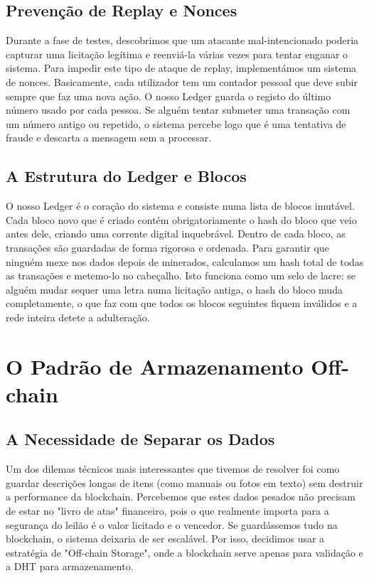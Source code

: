 \documentclass[11pt]{article}
\begin{document}
\subsection{Prevenção de Replay e Nonces}
Durante a fase de testes, descobrimos que um atacante mal-intencionado poderia capturar uma licitação legítima e reenviá-la várias vezes para tentar enganar o sistema. Para impedir este tipo de ataque de replay, implementámos um sistema de nonces. Basicamente, cada utilizador tem um contador pessoal que deve subir sempre que faz uma nova ação. O nosso Ledger guarda o registo do último número usado por cada pessoa. Se alguém tentar submeter uma transação com um número antigo ou repetido, o sistema percebe logo que é uma tentativa de fraude e descarta a mensagem sem a processar.

\subsection{A Estrutura do Ledger e Blocos}
O nosso Ledger é o coração do sistema e consiste numa lista de blocos imutável. Cada bloco novo que é criado contém obrigatoriamente o hash do bloco que veio antes dele, criando uma corrente digital inquebrável. Dentro de cada bloco, as transações são guardadas de forma rigorosa e ordenada. Para garantir que ninguém mexe nos dados depois de minerados, calculamos um hash total de todas as transações e metemo-lo no cabeçalho. Isto funciona como um selo de lacre: se alguém mudar sequer uma letra numa licitação antiga, o hash do bloco muda completamente, o que faz com que todos os blocos seguintes fiquem inválidos e a rede inteira detete a adulteração.

\section{O Padrão de Armazenamento Off-chain}

\subsection{A Necessidade de Separar os Dados}
Um dos dilemas técnicos mais interessantes que tivemos de resolver foi como guardar descrições longas de itens (como manuais ou fotos em texto) sem destruir a performance da blockchain. Percebemos que estes dados pesados não precisam de estar no "livro de atas" financeiro, pois o que realmente importa para a segurança do leilão é o valor licitado e o vencedor. Se guardássemos tudo na blockchain, o sistema deixaria de ser escalável. Por isso, decidimos usar a estratégia de "Off-chain Storage", onde a blockchain serve apenas para validação e a DHT para armazenamento.
\end{document}
